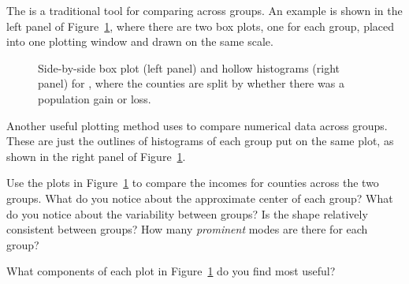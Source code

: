 The 
is a traditional tool for comparing across groups.
An example is shown in the left panel of
Figure~\ref{countyIncomeSplitByPopGain},
where there are two box plots, one for each group,
placed into one plotting window and drawn on the same scale.

\begin{figure}
  \centering
  \caption{Side-by-side box plot (left panel)
      and hollow histograms (right panel) for
      ,
      where the counties are split by whether there was
      a population gain or loss.}
  \label{countyIncomeSplitByPopGain}
\end{figure}

Another useful plotting method uses  to compare numerical data across groups. These are just the outlines of histograms of each group put on the same plot, as shown in the right panel of Figure~\ref{countyIncomeSplitByPopGain}.

\begin{exercisewrap}
\begin{nexercise} \label{comparingPriceByTypeExercise}
Use the plots in Figure~\ref{countyIncomeSplitByPopGain}
to compare the incomes for counties across the two groups.
What do you notice about the approximate center of each group?
What do you notice about the variability between groups?
Is the shape relatively consistent between groups?
How many \emph{prominent} modes are there for each
group?\footnotemark{}
\end{nexercise}
\end{exercisewrap}

\begin{exercisewrap}
\begin{nexercise}
What components of each plot in
Figure~\ref{countyIncomeSplitByPopGain}
do you find most useful?\footnotemark{}
\end{nexercise}
\end{exercisewrap}



